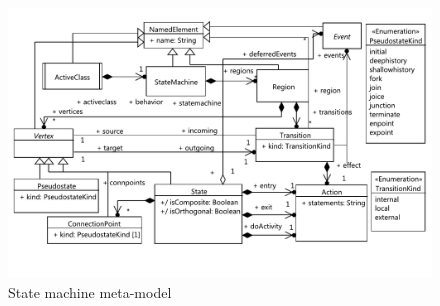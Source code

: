 \begin{figure}
	\centering
	\includegraphics[clip, trim=0.2cm 1.5cm 0.2cm 0.5cm, width=1.0\columnwidth]{figures/smmetamodel.pdf}
	\caption{State machine meta-model} 
	\label{fig:smmetamodel}
\end{figure}



